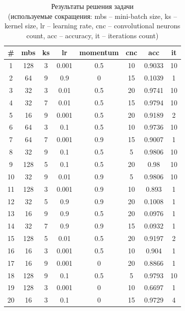 \begin{table}[ht]
	\caption{Результаты решения задачи \\(используемые сокращения: mbs -- mini-batch size, ks -- kernel size, lr -- learning rate, cnc -- convolutional neurons count, acc -- accuracy, it -- iterations count)}
	\centering
	\begin{tabular}{c c c c c c c c}
		\hline\hline
		\# & mbs & ks & lr    & momentum & cnc & acc    & it \\ [0.5ex] %
		\hline
		1        & 128 & 3  & 0.001 & 0.5      & 10  & 0.9033 & 10 \\
		2        & 64  & 9  & 0.9   & 0        & 15  & 0.1039 & 1  \\
		3        & 32  & 3  & 0.01  & 0.5      & 20  & 0.9741 & 10 \\
		4        & 32  & 7  & 0.01  & 0.5      & 15  & 0.9794 & 10 \\
		5        & 16  & 9  & 0.001 & 0.5      & 20  & 0.9189 & 2  \\
		6        & 64  & 3  & 0.1   & 0.5      & 10  & 0.9736 & 10 \\
		7        & 64  & 7  & 0.001 & 0.9      & 15  & 0.9007 & 1  \\
		8        & 32  & 9  & 0.1   & 0.5      & 5   & 0.9806 & 10 \\
		9        & 128 & 5  & 0.1   & 0.5      & 20  & 0.98   & 10 \\
		10       & 32  & 9  & 0.01  & 0.9      & 5   & 0.9806 & 10 \\
		11       & 128 & 3  & 0.001 & 0.9      & 10  & 0.893  & 1  \\
		12       & 32  & 5  & 0.9   & 0.9      & 20  & 0.1008 & 1  \\
		13       & 16  & 9  & 0.9   & 0.5      & 20  & 0.0976 & 1  \\
		14       & 32  & 7  & 0.9   & 0.9      & 15  & 0.0932 & 1  \\
		15       & 128 & 5  & 0.01  & 0.5      & 20  & 0.9197 & 2  \\
		16       & 16  & 3  & 0.001 & 0.5      & 10  & 0.904  & 1  \\
		17       & 16  & 9  & 0.001 & 0        & 20  & 0.8866 & 1  \\
		18       & 128 & 9  & 0.1   & 0.5      & 5   & 0.9793 & 10 \\
		19       & 128 & 3  & 0.001 & 0        & 10  & 0.6697 & 1  \\
		20       & 16  & 3  & 0.1   & 0        & 15  & 0.9729 & 4  \\

\end{tabular}
\end{table}

